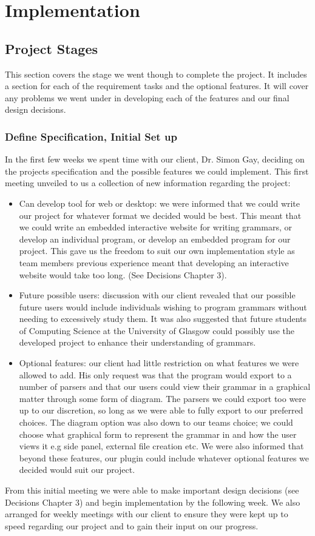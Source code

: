 \documentclass{l3proj}
\begin{document}
\chapter{Implementation}
\label{impl}

\section {Project Stages}
This section covers the stage we went though to complete the project. It includes a section for each of the requirement tasks and the optional features. It will cover any problems we went under in developing each of the features and our final design decisions. 

\subsection{Define Specification, Initial Set up}
In the first few weeks we spent time with our client, Dr. Simon Gay, deciding on the projects specification and the possible features we could implement. This first meeting unveiled to us a collection of new information regarding the project:
\begin {itemize}
	\item Can develop tool for web or desktop: we were informed that we could write our project for whatever format we decided would be best. This meant that we could write an embedded interactive website for writing grammars, or develop an individual program, or develop an embedded program for our project. This gave us the freedom to suit our own implementation style as team members previous experience meant that developing an interactive website would take too long. (See Decisions Chapter 3).
	\item Future possible users: discussion with our client revealed that our possible future users would include individuals wishing to program grammars without needing to excessively study them. It was also suggested that future students of Computing Science at the University of Glasgow could possibly use the developed project to enhance their understanding of grammars. 
	\item Optional features: our client had little restriction on what features we were allowed to add. His only request was that the program would export to a number of parsers and that our users could view their grammar in a graphical matter through some form of diagram. The parsers we could export too were up to our discretion, so long as we were able to fully export to our preferred choices. The diagram option was also down to our teams choice; we could choose what graphical form to represent the grammar in and how the user views it e.g side panel, external file creation etc. We were also informed that beyond these features, our plugin could include whatever optional features we decided would suit our project. 
\end{itemize}
From this initial meeting we were able to make important design decisions (see Decisions Chapter 3) and begin implementation by the following week. We also arranged for weekly meetings with our client to ensure they were kept up to speed regarding our project and to gain their input on our progress.\\
\end{document}

